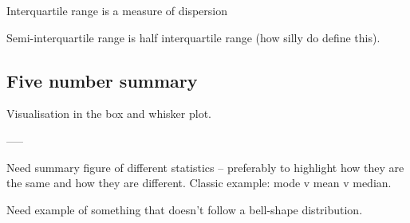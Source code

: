 \documentclass[a4paper,11pt]{report}
\begin{document}
Interquartile range is a measure of dispersion

Semi-interquartile range is half interquartile range (how silly do
define this).

\subsection{Five number summary}

Visualisation in the box and whisker plot.

-----

Need summary figure of different statistics -- preferably to highlight
how they are the same and how they are different. Classic example:
mode v mean v median.

Need example of something that doesn't follow a bell-shape distribution.
\end{document}
